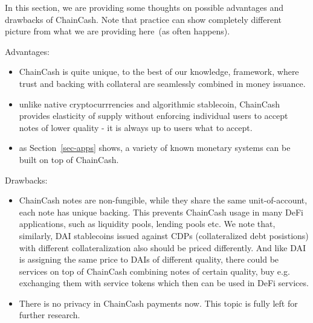 \documentclass{llncs}   %
\newcommand{\cc}{ChainCash}
\begin{document}
In this section, we are providing some thoughts on possible advantages and drawbacks of \cc{}. Note that practice can show
completely different picture from what we are providing here~(as often happens).

Advantages:
\begin{itemize}
  \item ChainCash is quite unique, to the best of our knowledge, framework, where trust and backing with collateral are
   seamlessly combined in money issuance.
  \item unlike native cryptocurrrencies and algorithmic stablecoin, \cc{} provides elasticity of supply without enforcing
  individual users to accept notes of lower quality - it is always up to users what to accept.
  \item as Section~\ref{sec-apps} shows, a variety of known monetary systems can be built on top of \cc{}.
\end{itemize}

Drawbacks:
\begin{itemize}
  \item ChainCash notes are non-fungible, while they share the same unit-of-account, each note has unique backing. This prevents ChainCash usage
  in many DeFi applications, such as liquidity pools, lending pools etc. We note that, similarly, DAI stablecoins issued against CDPs
  (collateralized debt posistions) with different collateralization also should be priced differently. And like DAI is assigning the same price to
  DAIs of different quality, there could be services on top of \cc{} combining notes of certain quality, buy e.g. exchanging them with service tokens
  which then can be used in DeFi services.
  \item There is no privacy in \cc{} payments now. This topic is fully left for further research.
\end{itemize}


\newpage

 
\end{document}
